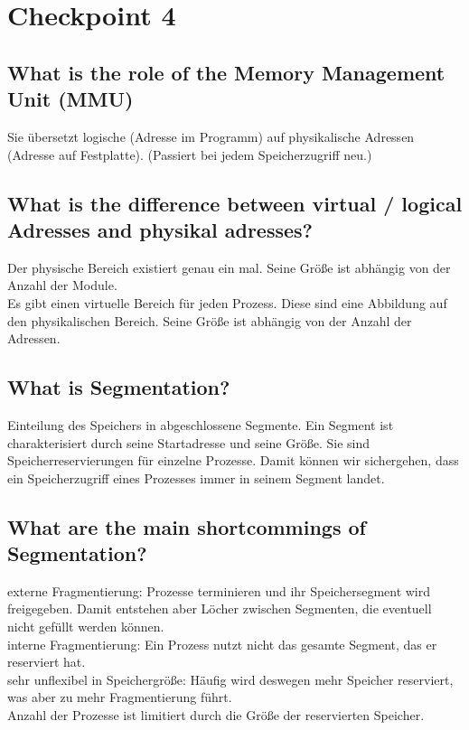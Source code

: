 \section{Checkpoint 4}

\addtocounter{subsection}{1}

\subsection{What is the role of the Memory Management Unit (MMU)}
Sie übersetzt logische (Adresse im Programm) auf physikalische Adressen (Adresse auf Festplatte).
(Passiert bei jedem Speicherzugriff neu.)

\subsection{What is the difference between virtual / logical Adresses and physikal adresses?}
Der physische Bereich existiert genau ein mal.
Seine Größe ist abhängig von der Anzahl der Module.\\
Es gibt einen virtuelle Bereich für jeden Prozess.
Diese sind eine Abbildung auf den physikalischen Bereich.
Seine Größe ist abhängig von der Anzahl der Adressen.

\subsection{What is Segmentation?}
Einteilung des Speichers in abgeschlossene Segmente.
Ein Segment ist charakterisiert durch seine Startadresse und seine Größe.
Sie sind Speicherreservierungen für einzelne Prozesse.
Damit können wir sichergehen, dass ein Speicherzugriff eines Prozesses immer in seinem Segment landet.

\subsection{What are the main shortcommings of Segmentation?}
externe Fragmentierung: Prozesse terminieren und ihr Speichersegment wird freigegeben. Damit entstehen aber Löcher zwischen Segmenten, die eventuell nicht gefüllt werden können.\\
interne Fragmentierung: Ein Prozess nutzt nicht das gesamte Segment, das er reserviert hat.\\
sehr unflexibel in Speichergröße: Häufig wird deswegen mehr Speicher reserviert, was aber zu mehr Fragmentierung führt.\\
Anzahl der Prozesse ist limitiert durch die Größe der reservierten Speicher.


